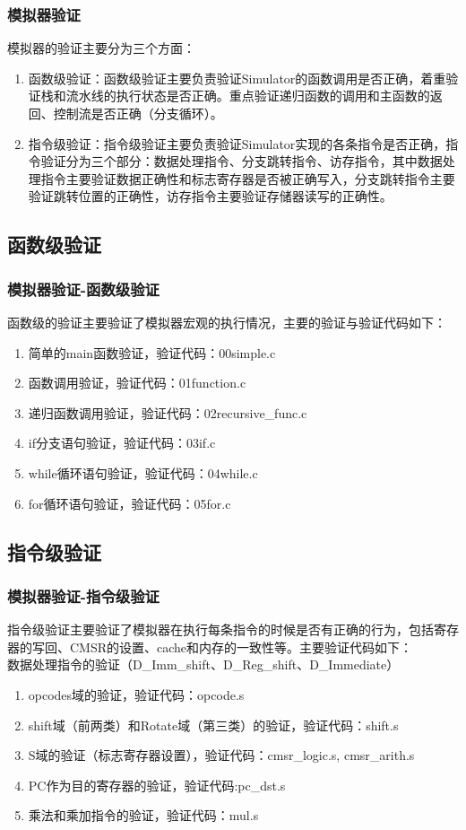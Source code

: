 \documentclass[CJK]{beamer}
\begin{document}
\begin{CJK}{UTF8}{gbsn}
\begin{frame}
	\frametitle{模拟器验证}
	模拟器的验证主要分为三个方面：
	\begin{enumerate}
		\item 函数级验证：函数级验证主要负责验证Simulator的函数调用是否正确，着重验证栈和流水线的执行状态是否正确。重点验证递归函数的调用和主函数的返回、控制流是否正确（分支循环）。
		\item 指令级验证：指令级验证主要负责验证Simulator实现的各条指令是否正确，指令验证分为三个部分：数据处理指令、分支跳转指令、访存指令，其中数据处理指令主要验证数据正确性和标志寄存器是否被正确写入，分支跳转指令主要验证跳转位置的正确性，访存指令主要验证存储器读写的正确性。
	\end{enumerate}
\end{frame}

\subsection{函数级验证}
\begin{frame}
	\frametitle{模拟器验证-函数级验证}
	函数级的验证主要验证了模拟器宏观的执行情况，主要的验证与验证代码如下：
	\begin{enumerate}
		\item 简单的main函数验证，验证代码：00simple.c
    	\item 函数调用验证，验证代码：01function.c
    	\item 递归函数调用验证，验证代码：02recursive\_func.c
    	\item if分支语句验证，验证代码：03if.c
    	\item while循环语句验证，验证代码：04while.c
    	\item for循环语句验证，验证代码：05for.c
	\end{enumerate}
\end{frame}

\subsection{指令级验证}
\begin{frame}
	\frametitle{模拟器验证-指令级验证}
	指令级验证主要验证了模拟器在执行每条指令的时候是否有正确的行为，包括寄存器的写回、CMSR的设置、cache和内存的一致性等。主要验证代码如下：\\
	数据处理指令的验证（D\_Imm\_shift、D\_Reg\_shift、D\_Immediate）
	\begin{enumerate}
		\item opcodes域的验证，验证代码：opcode.s
    	\item shift域（前两类）和Rotate域（第三类）的验证，验证代码：shift.s
    	\item S域的验证（标志寄存器设置），验证代码：cmsr\_logic.s, cmsr\_arith.s
    	\item PC作为目的寄存器的验证，验证代码:pc\_dst.s
    	\item 乘法和乘加指令的验证，验证代码：mul.s
    \end{enumerate}
\end{frame}


\end{CJK}
\end{document}
